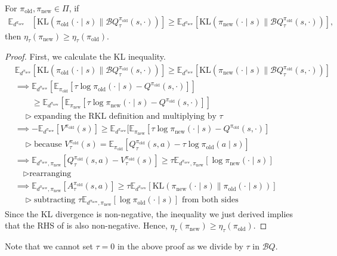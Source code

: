 \documentclass[twoside,11pt]{article}
\newcommand{\Ex}{\mathbb{E}}
\newcommand{\KL}{\mathrm{KL}}
\newcommand{\boltzmannQ}{\mathcal{B}Q}
\newcommand{\pinew}{{\pi_\mathrm{new}}}
\newcommand{\piold}{{\pi_\mathrm{old}}}
\begin{document}
\begin{proposition}\label{prop:avg-reverse-kl}
For $\piold, \pinew \in \Pi$, if
\begin{align}\label{eq:avg-rev-kl-policy-assumption}
    \Ex_{d^{\pinew}}&[\KL(\piold(\cdot \mid s) \parallel \boltzmannQ_\tau^{\piold}(s, \cdot))] \geq \Ex_{d^{\pinew}}[\KL(\pinew(\cdot \mid s) \parallel \boltzmannQ_\tau^{\piold}(s, \cdot))], \nonumber
\end{align}
then $\eta_\tau(\pinew) \geq \eta_\tau(\piold)$.

\end{proposition}
\begin{proof}
First, we calculate the KL inequality.
\begin{align*}
    &\Ex_{d^{\pinew}}[\KL(\piold(\cdot \mid s) \parallel \boltzmannQ_\tau^{\piold}(s, \cdot))] \geq \Ex_{d^{\pinew}}[\KL(\pinew(\cdot \mid s) \parallel \boltzmannQ_\tau^{\piold}(s, \cdot))]\\
    &\implies \Ex_{d^{\pinew}}[\Ex_{\piold}[\tau \log \piold(\cdot \mid s) - Q^{\piold}(s,\cdot)]] \\
    & \quad\quad\geq \Ex_{d^{\pinew}}[\Ex_{\pinew}[\tau \log \pinew(\cdot \mid s) - Q^{\piold}(s, \cdot)]]\\
    &\quad \triangleright \text{expanding the RKL definition and multiplying by } \tau\\
    &\implies -\Ex_{d^{\pinew}}[V^{\piold}(s)] \geq \Ex_{d^{\pinew}}[\Ex_{\pinew}[\tau \log \pinew(\cdot \mid s) - Q^{\piold}(s, \cdot)]\\
    &\quad \triangleright \text{because } V^\piold_\tau(s) = \Ex_\piold[Q^\piold_\tau(s, a) - \tau \log \piold(a \mid s)]\\
    &\implies \Ex_{d^{\pinew}, \pinew}[Q^{\piold}_\tau(s, a) - V^{\piold}_\tau(s)] \geq \tau \Ex_{d^{\pinew}, \pinew}[\log \pinew(\cdot \mid s)]\\
    &\quad \triangleright \text{rearranging}\\
    &\implies \Ex_{d^{\pinew}, \pinew}[A_\tau^{\piold}(s, a)] \geq \tau \Ex_{d^{\pinew}}[\KL(\pinew(\cdot \mid s) \parallel \piold(\cdot \mid s))]\\
    &\quad \triangleright \text{subtracting } \tau \Ex_{d^\pinew, \pinew}[\log \piold(\cdot \mid s) ] \text{ from both sides}
\end{align*}
%
Since the KL divergence is non-negative, the inequality we just derived implies that the RHS of  is also non-negative. Hence, $\eta_\tau(\pinew) \geq \eta_\tau(\piold).$
\end{proof}
\noindent Note that we cannot set $\tau = 0$ in the above proof as we divide by $\tau$ in $\boltzmannQ$. 
\end{document}
